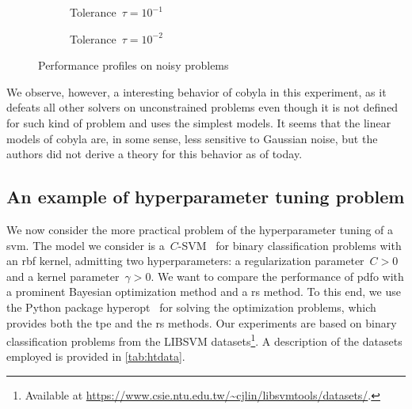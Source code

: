 \begin{figure}[ht]
    \centering
    \begin{subfigure}[b]{0.49\textwidth}
        \centering
        \caption{Tolerance~$\tau = 10^{-1}$}
    \end{subfigure}
    \hfill
    \begin{subfigure}[b]{0.49\textwidth}
        \centering
        \caption{Tolerance~$\tau = 10^{-2}$}
    \end{subfigure}
    \caption{Performance profiles on noisy problems}
    \label{fig:ppun-50}
\end{figure}

We observe, however, a interesting behavior of \gls{cobyla} in this experiment, as it defeats all other solvers on unconstrained problems even though it is not defined for such kind of problem and uses the simplest models.
It seems that the linear models of \gls{cobyla} are, in some sense, less sensitive to Gaussian noise, but the authors did not derive a theory for this behavior as of today.

\subsection{An example of hyperparameter tuning problem}

We now consider the more practical problem of the hyperparameter tuning of a \gls{svm}.
The model we consider is a~$C$-SVM~\cite{Chang_Lin_2011} for binary classification problems with an \gls{rbf} kernel, admitting two hyperparameters: a regularization parameter~$C > 0$ and a kernel parameter~$\gamma > 0$.
We want to compare the performance of \gls{pdfo} with a prominent Bayesian optimization method and a \gls{rs} method.
To this end, we use the Python package hyperopt~\cite{Bergstra_Yamins_Cox_2013} for solving the optimization problems, which provides both the \gls{tpe} and the \gls{rs} methods.
Our experiments are based on binary classification problems from the LIBSVM datasets\footnote{Available at \url{https://www.csie.ntu.edu.tw/~cjlin/libsvmtools/datasets/}.}.
A description of the datasets employed is provided in \cref{tab:htdata}.

